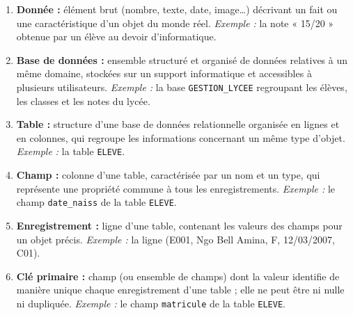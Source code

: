 \documentclass[11pt]{article}
\newcommand{\cle}[1]{{\popxbold\color{popdark}#1}}
\begin{document}
\begin{corrige}
\begin{enumerate}
\item \textbf{\cle{Donnée} :} élément brut (nombre, texte, date, image\dots) décrivant un fait ou une caractéristique d'un objet du monde réel. \emph{Exemple :} la note « 15/20 » obtenue par un élève au devoir d'informatique.
\item \textbf{\cle{Base de données} :} ensemble structuré et organisé de données relatives à un même domaine, stockées sur un support informatique et accessibles à plusieurs utilisateurs. \emph{Exemple :} la base \texttt{GESTION\_LYCEE} regroupant les élèves, les classes et les notes du lycée.
\item \textbf{\cle{Table} :} structure d'une base de données relationnelle organisée en lignes et en colonnes, qui regroupe les informations concernant un même type d'objet. \emph{Exemple :} la table \texttt{ELEVE}.
\item \textbf{\cle{Champ} :} colonne d'une table, caractérisée par un nom et un type, qui représente une propriété commune à tous les enregistrements. \emph{Exemple :} le champ \texttt{date\_naiss} de la table \texttt{ELEVE}.
\item \textbf{\cle{Enregistrement} :} ligne d'une table, contenant les valeurs des champs pour un objet précis. \emph{Exemple :} la ligne (E001, Ngo Bell Amina, F, 12/03/2007, C01).
\item \textbf{\cle{Clé primaire} :} champ (ou ensemble de champs) dont la valeur identifie de manière unique chaque enregistrement d'une table ; elle ne peut être ni nulle ni dupliquée. \emph{Exemple :} le champ \texttt{matricule} de la table \texttt{ELEVE}.
\end{enumerate}
\end{corrige}
\end{document}
